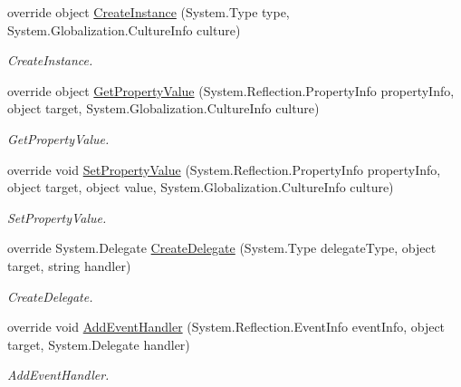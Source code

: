 \begin{DoxyCompactItemize}
\item 
override object \hyperlink{class_xaml_generated_namespace_1_1_generated_internal_type_helper_aefb7a98fceb9c287cef4756942f441d1}{CreateInstance} (System.Type type, System.Globalization.CultureInfo culture)
\begin{DoxyCompactList}\small\item\em CreateInstance. \item\end{DoxyCompactList}\item 
override object \hyperlink{class_xaml_generated_namespace_1_1_generated_internal_type_helper_afdc9fe15b56607d02082908d934480c6}{GetPropertyValue} (System.Reflection.PropertyInfo propertyInfo, object target, System.Globalization.CultureInfo culture)
\begin{DoxyCompactList}\small\item\em GetPropertyValue. \item\end{DoxyCompactList}\item 
override void \hyperlink{class_xaml_generated_namespace_1_1_generated_internal_type_helper_ade0f04c0f7b18dd5b170e071d5534d38}{SetPropertyValue} (System.Reflection.PropertyInfo propertyInfo, object target, object value, System.Globalization.CultureInfo culture)
\begin{DoxyCompactList}\small\item\em SetPropertyValue. \item\end{DoxyCompactList}\item 
override System.Delegate \hyperlink{class_xaml_generated_namespace_1_1_generated_internal_type_helper_a8ec4c37e82d9f4e867e9655f4eac3a78}{CreateDelegate} (System.Type delegateType, object target, string handler)
\begin{DoxyCompactList}\small\item\em CreateDelegate. \item\end{DoxyCompactList}\item 
override void \hyperlink{class_xaml_generated_namespace_1_1_generated_internal_type_helper_a73471f4a6d1ca4c4fceec9ad8610f0c8}{AddEventHandler} (System.Reflection.EventInfo eventInfo, object target, System.Delegate handler)
\begin{DoxyCompactList}\small\item\em AddEventHandler. \item\end{DoxyCompactList}\item 

\end{DoxyCompactItemize}
